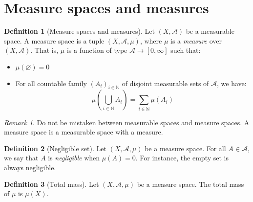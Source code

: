 \documentclass{article}
\theoremstyle{definition}
\newtheorem{definition}{Definition}[section]
\theoremstyle{remark}
\newtheorem*{remark}{Remark}
\theoremstyle{example}
\theoremstyle{notation}
\theoremstyle{axiom}
\begin{document}
\section{Measure spaces and measures}

\begin{definition}[Measure spaces and measures]
    Let $(X, \mathcal{A})$ be a measurable space. A measure space is a tuple $(X, \mathcal{A}, \mu)$, where $\mu$ is a \textit{measure} over $(X, \mathcal{A})$. That is, $\mu$ is a function of type $\mathcal{A} \rightarrow [0, \infty]$ such that:
    \begin{itemize}
        \item $\mu(\varnothing) = 0$
        \item For all countable family $(A_i)_{i \in \mathbb{N}}$ of disjoint measurable sets of $\mathcal{A}$, we have:
            $$\mu(\bigcup_{i \in \mathbb{N}} A_i) = \sum_{i \in \mathbb{N}} \mu(A_i)$$
    \end{itemize}
\end{definition}

\begin{remark}
    Do not be mistaken between measurable spaces and measure spaces. A measure space is a measurable space with a measure.
\end{remark}

\begin{definition}[Negligible set]
    Let $(X, \mathcal{A}, \mu)$ be a measure space. For all $A \in \mathcal{A}$, we say that $A$ is \textit{negligible} when $\mu(A) = 0$. For instance, the empty set is always negligible.
\end{definition}

\begin{definition}[Total mass]
    Let $(X, \mathcal{A}, \mu)$ be a measure space. The total mass of $\mu$ is $\mu(X)$.
\end{definition}

\end{document}
